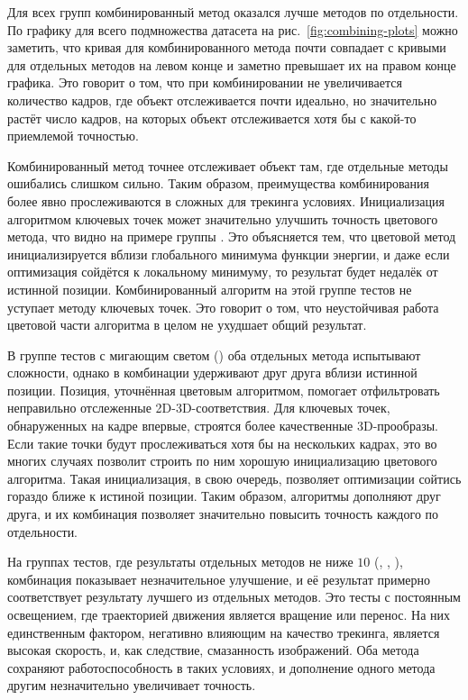 Для всех групп комбинированный метод оказался лучше методов по отдельности.
По графику для всего подмножества датасета на рис.~\ref{fig:combining-plots}
можно заметить, что кривая для комбинированного метода почти совпадает с
кривыми для отдельных методов на левом конце и заметно превышает их на правом
конце графика.
Это говорит о том, что при комбинировании не увеличивается количество кадров,
где объект отслеживается почти идеально, но значительно растёт число кадров, на
которых объект отслеживается хотя бы с какой-то приемлемой точностью.

Комбинированный метод точнее отслеживает объект там, где отдельные методы
ошибались слишком сильно.
Таким образом, преимущества комбинирования более явно прослеживаются в сложных
для трекинга условиях.
Инициализация алгоритмом ключевых точек может значительно улучшить точность
цветового метода, что видно на примере группы .
Это объясняется тем, что цветовой метод инициализируется вблизи глобального
минимума функции энергии, и даже если оптимизация сойдётся к локальному
минимуму, то результат будет недалёк от истинной позиции.
Комбинированный алгоритм на этой группе тестов не уступает методу ключевых
точек.
Это говорит о том, что неустойчивая работа цветовой части алгоритма в целом не
ухудшает общий результат.

В группе тестов с мигающим светом () оба отдельных метода
испытывают сложности, однако в комбинации удерживают друг друга вблизи
истинной позиции.
Позиция, уточнённая цветовым алгоритмом, помогает отфильтровать неправильно
отслеженные 2D-3D-соответствия.
Для ключевых точек, обнаруженных на кадре впервые, строятся более качественные
3D-прообразы.
Если такие точки будут прослеживаться хотя бы на нескольких кадрах, это во
многих случаях позволит строить по ним хорошую инициализацию цветового
алгоритма.
Такая инициализация, в свою очередь, позволяет оптимизации сойтись гораздо ближе
к истиной позиции. 
Таким образом, алгоритмы дополняют друг друга, и их комбинация позволяет
значительно повысить точность каждого по отдельности.

На группах тестов, где результаты отдельных методов не ниже $10$
(, , ), комбинация показывает незначительное улучшение, и её результат
примерно соответствует результату лучшего из отдельных методов.
Это тесты с постоянным освещением, где траекторией движения является вращение
или перенос.
На них единственным фактором, негативно влияющим на качество трекинга, является
высокая скорость, и, как следствие, смазанность изображений.
Оба метода сохраняют работоспособность в таких условиях, и дополнение одного
метода другим незначительно увеличивает точность.


